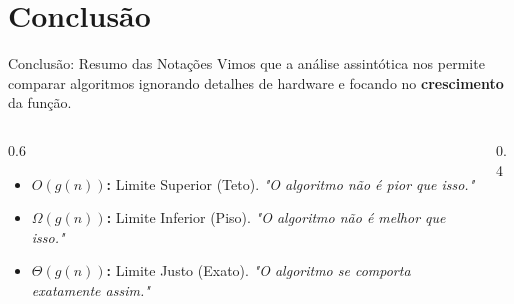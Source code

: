 \documentclass[aspectratio=169]{beamer}
\begin{document}
\section{Conclusão}

\begin{frame}{Conclusão: Resumo das Notações}
    Vimos que a análise assintótica nos permite comparar algoritmos ignorando detalhes de hardware e focando no \textbf{crescimento} da função.

    \begin{columns}
        \begin{column}{0.6\textwidth}
            \begin{itemize}
                \item \textbf{$O(g(n))$:} Limite Superior (Teto). 
                \textit{"O algoritmo não é pior que isso."}
                \item \textbf{$\Omega(g(n))$:} Limite Inferior (Piso). 
                \textit{"O algoritmo não é melhor que isso."}
                \item \textbf{$\Theta(g(n))$:} Limite Justo (Exato). 
                \textit{"O algoritmo se comporta exatamente assim."}
            \end{itemize}
        \end{column}
        \begin{column}{0.4\textwidth}
            \centering
        \end{column}
    \end{columns}
\end{frame}
\end{document}
